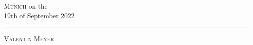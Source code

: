\documentclass[12pt, a4paper]{article}
\begin{document}
    \flushright
    \begin{minipage}{0.5\textwidth}
        \begin{flushleft} \large
        \textsc{Munich}                     %
        on the \\ 19th of September 2022                %
        \vspace{2cm}\\
    	{\rule[-3pt]{\linewidth}{.4pt}\par\smallskip  
        \textsc{Valentin Meyer}	\\         %
    	}
        \end{flushleft}
        \end{minipage}

    \begin{comment}
        Tips for sources:
        Good Journals:
        	Top5 (AmericanEconomicReview, Journal of Political Economy, Econometrica, Quarterly Journal of Economics, Review of Economics Studies);
            NBER, CESifo etc Working Paper;
            Good Field Journals;
            Handelsblatt Ranking etc.
        	Always ask:
            	Do they conduct proper Peer-review?
                Who are the authors?
           Careful with Thinktanks, research whether they are biased
        Cite your supervisour
            Always a nice move
            Make extra sure you understand their paper
            Unfortunate spot for a mistake
        The References (Bibliography) should contain only that sources that you are referringto in the text, listed in alphabetical orler:oMonographs: surname, given name(s) resp. initials, (editor), year, title,subtitle, edition, volume, place of publication.
    Journal articles: surname, given name(s), year, title of the article, title of thejournal, volume, page numbers.
    Articles in miscellanies: surname, given name(s), year, title of the article, in:surname, name(s), (editor), year, title, ..., page numbers.
    If in doubt, have a look at the bibliography in papers that are published in the American Economic Review.
    •Sources of all figures and tables which you have adopted from other texts have to be cited precisely (i.e. including the exact page)
    
\end{comment}
  
\end{document}
